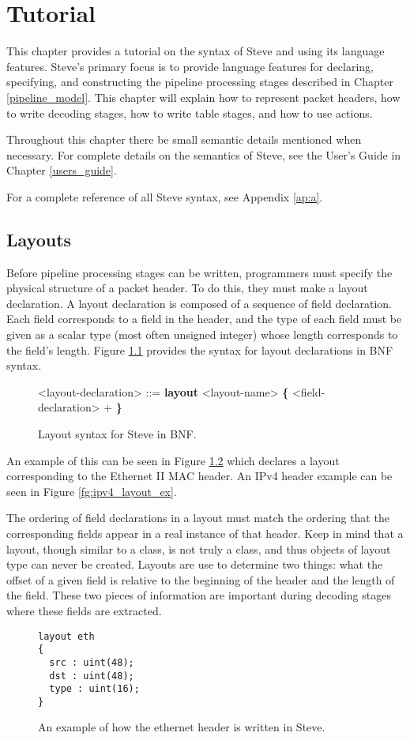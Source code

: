 \chapter{Tutorial} \label{tutorial}

This chapter provides a tutorial on the syntax of Steve and using its language features. Steve's primary focus is to provide language features for declaring, specifying, and constructing the pipeline processing stages described in Chapter \ref{pipeline_model}. This chapter will explain how to represent packet headers, how to write decoding stages, how to write table stages, and how to use actions.

Throughout this chapter there be small semantic details mentioned when necessary. For complete details on the semantics of Steve, see the User's Guide in Chapter \ref{users_guide}.

For a complete reference of all Steve syntax, see Appendix \ref{ap:a}.

\section{Layouts} \label{layout_tut}

Before pipeline processing stages can be written, programmers must specify the physical structure of a packet header. To do this, they must make a layout declaration. A layout declaration is composed of a sequence of field declaration. Each field corresponds to a field in the header, and the type of each field must be given as a scalar type (most often unsigned integer) whose length corresponds to the field's length. Figure \ref{fg:layout_syntax} provides the syntax for layout declarations in BNF syntax.

\begin{figure}
\begin{mdframed}
\begin{grammar}
<layout-declaration> ::=
\textbf{layout} <layout-name> 
\textbf{\{}
	<field-declaration> +
\textbf{\}}
\end{grammar}
\end{mdframed}
\caption{Layout syntax for Steve in BNF.}
\label{fg:layout_syntax}
\end{figure}


An example of this can be seen in Figure \ref{fg:ethernet_layout_ex} which declares a layout corresponding to the Ethernet II MAC header. An IPv4 header example can be seen in Figure \ref{fg:ipv4_layout_ex}.

The ordering of field declarations in a layout must match the ordering that the corresponding fields appear in a real instance of that header. Keep in mind that a layout, though similar to a class, is not truly a class, and thus objects of layout type can never be created. Layouts are use to determine two things: what the offset of a given field is relative to the beginning of the header and the length of the field. These two pieces of information are important during decoding stages where these fields are extracted.

\begin{figure}
\begin{lstlisting}[frame=single]
layout eth
{
  src : uint(48);
  dst : uint(48);
  type : uint(16);
}
\end{lstlisting}
\caption{An example of how the ethernet header is written in Steve.}
\label{fg:ethernet_layout_ex}
\end{figure}


